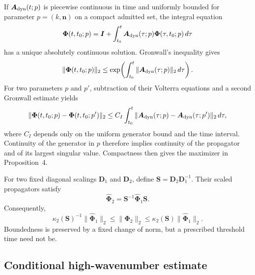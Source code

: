 If $\boldsymbol A_{\rm dyn}(t;p)$ is piecewise continuous in time and uniformly bounded for parameter $p=(k,\boldsymbol n)$ on a compact admitted set, the integral equation
\begin{equation}
 \boldsymbol\Phi(t,t_0;p)=\boldsymbol I+
 \int_{t_0}^{t}\boldsymbol A_{\rm dyn}(\tau;p)
 \boldsymbol\Phi(\tau,t_0;p)\,d\tau
 \label{eq:app_volterra_propagator}
\end{equation}
has a unique absolutely continuous solution. Gronwall's inequality gives
\begin{equation}
 \|\boldsymbol\Phi(t,t_0;p)\|_2
 \le\exp\!\left(\int_{t_0}^{t}
 \|\boldsymbol A_{\rm dyn}(\tau;p)\|_2\,d\tau\right).
 \label{eq:app_propagator_bound}
\end{equation}
For two parameters $p$ and $p'$, subtraction of their Volterra equations and a second Gronwall estimate yields
\begin{equation}
 \|\boldsymbol\Phi(t,t_0;p)-\boldsymbol\Phi(t,t_0;p')\|_2
 \le C_I\int_{t_0}^{t}
 \|\boldsymbol A_{\rm dyn}(\tau;p)-
 \boldsymbol A_{\rm dyn}(\tau;p')\|_2\,d\tau,
 \label{eq:app_parameter_continuity}
\end{equation}
where $C_I$ depends only on the uniform generator bound and the time interval. Continuity of the generator in $p$ therefore implies continuity of the propagator and of its largest singular value. Compactness then gives the maximizer in Proposition~4.

For two fixed diagonal scalings $\boldsymbol D_1$ and $\boldsymbol D_2$, define $\boldsymbol S=\boldsymbol D_2\boldsymbol D_1^{-1}$. Their scaled propagators satisfy
\begin{equation}
 \widehat{\boldsymbol\Phi}_2
 =\boldsymbol S^{-1}\widehat{\boldsymbol\Phi}_1\boldsymbol S.
 \label{eq:app_norm_similarity}
\end{equation}
Consequently,
\begin{equation}
 \kappa_2(\boldsymbol S)^{-1}\|\widehat{\boldsymbol\Phi}_1\|_2
 \le\|\widehat{\boldsymbol\Phi}_2\|_2
 \le\kappa_2(\boldsymbol S)\|\widehat{\boldsymbol\Phi}_1\|_2.
 \label{eq:app_norm_equivalence}
\end{equation}
Boundedness is preserved by a fixed change of norm, but a prescribed threshold time need not be.

\subsection{Conditional high-wavenumber estimate}

